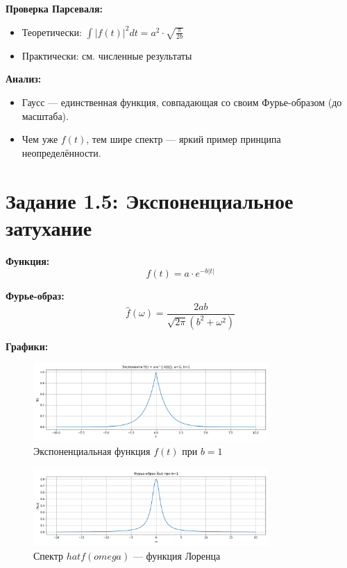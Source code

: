 \textbf{Проверка Парсеваля:}

\begin{itemize}
    \item Теоретически: $\displaystyle \int |f(t)|^2 dt = a^2 \cdot \sqrt{\frac{\pi}{2b}}$
    \item Практически: см. численные результаты
\end{itemize}

\textbf{Анализ:}

\begin{itemize}
    \item Гаусс — единственная функция, совпадающая со своим Фурье-образом (до масштаба).
    \item Чем уже $f(t)$, тем шире спектр — яркий пример принципа неопределённости.
\end{itemize}

\section*{Задание 1.5: Экспоненциальное затухание}

\textbf{Функция:}
\[
f(t) = a \cdot e^{-b |t|}
\]

\textbf{Фурье-образ:}
\[
\hat{f}(\omega) = \frac{2ab}{\sqrt{2\pi}(b^2 + \omega^2)}
\]

\textbf{Графики:}

\begin{figure}[h!]
    \centering
    \includegraphics[width=0.8\textwidth]{exp_function_b1.png}
    \caption{Экспоненциальная функция $f(t)$ при $b = 1$}
\end{figure}

\begin{figure}[h!]
    \centering
    \includegraphics[width=0.8\textwidth]{exp_spectrum_b1.png}
    \caption{Спектр $hat{f}(omega)$ — функция Лоренца}
\end{figure}

